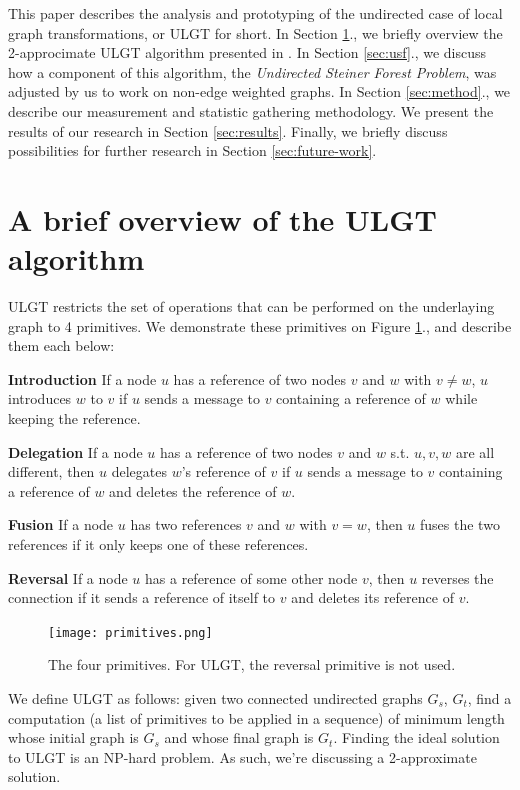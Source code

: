 \documentclass{article}
\begin{document}
This paper describes the analysis and prototyping of the undirected case of local graph transformations, or ULGT for short. In Section \ref{sec:ulgt}., we briefly overview the 2-approcimate ULGT algorithm presented in \cite{ulgt}. In Section \ref{sec:usf}., we discuss how a component of this algorithm, the \textit{Undirected Steiner Forest Problem}, was adjusted by us to work on non-edge weighted graphs. In Section \ref{sec:method}., we describe our measurement and statistic gathering methodology. We present the results of our research in Section \ref{sec:results}. Finally, we briefly discuss possibilities for further research in Section \ref{sec:future-work}.

\section{A brief overview of the ULGT algorithm}
\label{sec:ulgt}

ULGT restricts the set of operations that can be performed on the underlaying graph to 4 primitives. We demonstrate these primitives on Figure \ref{fig:primitives}., and describe them each below:

\textbf{Introduction} If a node $u$ has a reference of two nodes $v$ and $w$ with $v \neq w$, $u$ introduces $w$
to $v$ if $u$ sends a message to $v$ containing a reference of $w$ while keeping the reference.

\textbf{Delegation} If a node $u$ has a reference of two nodes $v$ and $w$ s.t. $u, v, w$ are all different,
then $u$ delegates $w$’s reference of $v$ if $u$ sends a message to $v$ containing a reference of $w$
and deletes the reference of $w$.

\textbf{Fusion} If a node $u$ has two references $v$ and $w$ with $v = w$, then $u$ fuses the two references
if it only keeps one of these references.

\textbf{Reversal} If a node $u$ has a reference of some other node $v$, then $u$ reverses the connection
if it sends a reference of itself to $v$ and deletes its reference of $v$.

\begin{figure}
  \centering
  \texttt{[image: primitives.png]}
  \caption{The four primitives. For ULGT, the reversal primitive is not used.}
  \label{fig:primitives}
\end{figure}

We define ULGT as follows: given
two connected undirected graphs $G_s$, $G_t$, find a computation (a list of primitives to be applied in a sequence) of minimum length whose initial
graph is $G_s$ and whose final graph is $G_t$. Finding the ideal solution to ULGT is an NP-hard problem. As such, we're discussing a 2-approximate solution.
\end{document}
